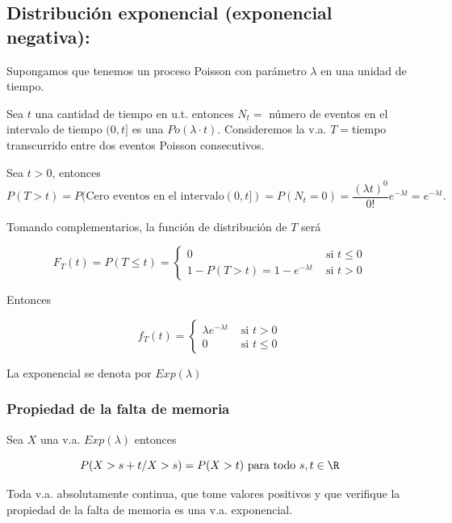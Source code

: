 \normalsize



         \subsection{Distribución exponencial (exponencial negativa):}
         Supongamos que tenemos un proceso Poisson con parámetro
         $\lambda$ en una unidad de tiempo.

         Sea $t$ una cantidad de tiempo en u.t. entonces $N_{t}=$ número de
         eventos en el intervalo de tiempo $(0,t]$
         es una $Po(\lambda\cdot t)$. Consideremos la v.a.
         $T=$tiempo transcurrido entre dos eventos Poisson consecutivos.

         Sea $t>0$, entonces
         $$P(T>t)=P(\mbox{Cero eventos en el
         intervalo}(0,t])
         =P(N_{t}=0)=
         \frac{(\lambda t)^0}{0!} e^{-\lambda
         t}=e^{-\lambda t}.$$


         Tomando complementarios, la función de distribución de $T$ será

         $$F_{T}(t)=P(T\leq t)=\left\{\begin{array}{ll} 0 &\mbox{ si } t\leq 0\\
          1-P(T>t)=1-e^{-\lambda t}& \mbox{ si } t>0\end{array}\right.$$

         Entonces

         $$f_{T}(t)=\left\{\begin{array}{ll}
         \lambda e^{-\lambda t} & \mbox{ si }  t>0\\
         0 & \mbox{ si } t\leq 0
         \end{array}\right.$$

         La exponencial se denota por $Exp(\lambda)$

\subsubsection{Propiedad de la falta de memoria}

          Sea $X$  una v.a. $Exp(\lambda)$ entonces

          $$P(X>s+t/X>s)=P(X>t)\mbox{  para todo } s,t\in \R$$

          Toda v.a. absolutamente continua, que tome valores positivos
          y que verifique la propiedad de la falta de memoria es una v.a.
          exponencial.



